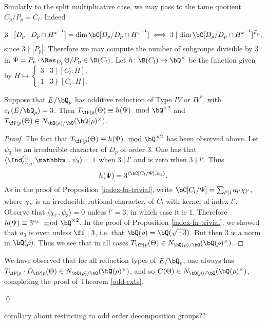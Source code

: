 Similarly to the split multiplicative case, we may pass to the tame quotient $C_p / P_p = C_l$. Indeed 

\[ 3 \mid  [D_p : D_p \cap H^{x^{-1}}] = \dim \bC [ D_p / D_p \cap H^{x^{-1}}] \iff 3 \mid \dim \bC[ D_p / D_p \cap H^{x^{-1}} ]^{P_p},\] 
since $3 \nmid|P_p|$. Therefore we may compute the number of subgroups divisible by $3$ in $\Psi = P_p \cdot \Res_{D_p} \Theta / P_p \in \B(C_l)$.  Let $h \colon \B(C_l) \to \bQ^{\times}$ be the function given by $H \mapsto \begin{cases} 3 & 3 \mid [C_l : H], \\ 1 & 3 \nmid [C_l : H]. \end{cases}$

\begin{prop}
   Suppose that $E / \bQ_p$ has additive reduction of Type $IV$ or $IV^*$, with $c_v(E / \bQ_p) = 3$.  Then $T_{\fP \mid p}(\Theta) \equiv h(\Psi) \mod \bQ^{\times 2}$ and $T_{\fP \mid p}(\Theta) \in \fieldnorm{\rho}$. 
\end{prop}

\begin{proof}
The fact that $T_{\fP \mid p}(\Theta) \equiv h(\Psi) \mod \bQ^{\times 2}$ has been observed above.
Let $\psi_3$ be an irreducible character of $D_p$ of order $3$. One has that $ \langle \Ind_{C_{l / l'}}^{C_l} \trivial , \psi_3 \rangle =  1$ when $3 \mid l'$ and is zero when  $3 \nmid l'$. 
Thus $$h(\Psi) = 3^{\langle \bC[C_l / \Psi], \psi_3 \rangle}.$$ As in the proof of Proposition \ref{index-fn-trivial}, write $\bC[C_l / \Psi] = \sum_{l' \mid l} a_{l'} \chi_{l'}$, where $\chi_{l'}$ is an irreducible rational character, of $C_l$ with kernel of index $l'$. Observe that $\langle \chi_{l'}, \psi_3 \rangle = 0$ unless $l' = 3$, in which case it is $1$. Therefore $h(\Psi) \equiv 3^{a_3} \mod \bQ^{\times 2}$. In the proof of Proposition \ref{index-fn-trivial}, we showed that $a_3$ is even unless $\ff \mid 3$,  i.e. that $\bQ(\rho) = \bQ(\sqrt{-3})$. But then $3$ is a norm in $\bQ(\rho)$. Thus we see that in all cases $T_{\fP \mid p}(\Theta) \in N_{\bQ(\rho) / \bQ}(\bQ(\rho)^{\times})$. 
\end{proof}

We have observed that for all reduction types of $E / \bQ_p$, one always has $T_{\fP \mid p} \cdot D_{\fP \mid p}(\Theta) \in \fieldnorm{\rho}$, and so $C(\Theta) \in \fieldnorm{\rho}$, completing the proof of Theorem \ref{odd-exts}.

\qed

{\color{red} corollary about restricting to odd order decomposition groups??}

